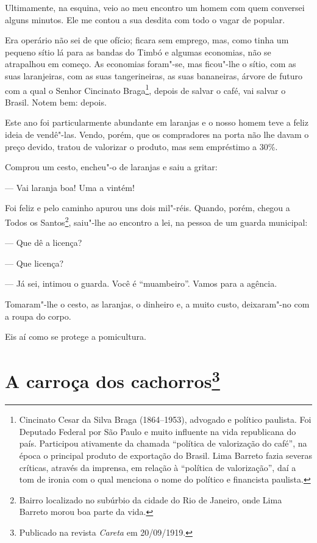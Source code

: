 Ultimamente, na esquina, veio ao meu encontro um homem com quem
conversei alguns minutos. Ele me contou a sua desdita com todo o vagar
de popular.

Era operário não sei de que ofício; ficara sem emprego, mas, como tinha
um pequeno sítio lá para as bandas do Timbó e algumas economias, não se
atrapalhou em começo. As economias foram"-se, mas ficou"-lhe o sítio, com
as suas laranjeiras, com as suas tangerineiras, as suas bananeiras,
árvore de futuro com a qual o Senhor Cincinato Braga\footnote{Cincinato
  Cesar da Silva Braga (1864--1953), advogado e político paulista. Foi
  Deputado Federal por São Paulo e muito influente na vida republicana
  do país. Participou ativamente da chamada ``política de valorização do
  café'', na época o principal produto de exportação do Brasil. Lima
  Barreto fazia severas críticas, através da imprensa, em relação à
  ``política de valorização'', daí a tom de ironia com o qual menciona o
  nome do político e financista paulista.}, depois de salvar o café, vai
salvar o Brasil. Notem bem: depois.

Este ano foi particularmente abundante em laranjas e o nosso homem teve
a feliz ideia de vendê"-las. Vendo, porém, que os compradores na porta
não lhe davam o preço devido, tratou de valorizar o produto, mas sem
empréstimo a 30\%.

Comprou um cesto, encheu"-o de laranjas e saiu a gritar:

--- Vai laranja boa! Uma a vintém!

Foi feliz e pelo caminho apurou uns dois mil"-réis. Quando, porém, chegou
a Todos os Santos\footnote{Bairro localizado no subúrbio da cidade do
  Rio de Janeiro, onde Lima Barreto morou boa parte da vida.}, saiu"-lhe
ao encontro a lei, na pessoa de um guarda municipal:

--- Que dê a licença?

--- Que licença?

--- Já sei, intimou o guarda. Você é ``muambeiro''. Vamos para a agência.

Tomaram"-lhe o cesto, as laranjas, o dinheiro e, a muito custo,
deixaram"-no com a roupa do corpo.

Eis aí como se protege a pomicultura.



\chapter[A carroça dos cachorros]{A carroça dos cachorros\footnote[*]{Publicado na revista \emph{Careta} em 20/09/1919.}}


